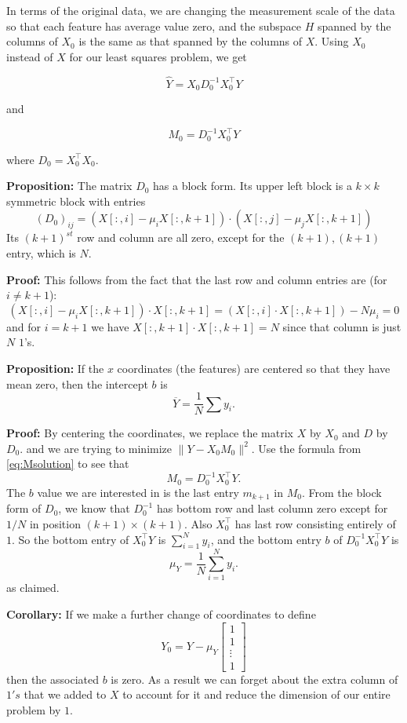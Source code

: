 \documentclass[
]{article}
\begin{document}
In terms of the original data, we are changing the measurement scale of
the data so that each feature has average value zero, and the subspace
\(H\) spanned by the columns of \(X_{0}\) is the same as that spanned by
the columns of \(X\). Using \(X_{0}\) instead of \(X\) for our least
squares problem, we get

\[
\hat{Y} = X_{0}D_{0}^{-1}X_{0}^{\intercal}Y
\]

and

\[
M_{0} = D_{0}^{-1}X_{0}^{\intercal}Y
\]

where \(D_{0}=X_{0}^{\intercal}X_{0}.\)

\textbf{Proposition:} The matrix \(D_{0}\) has a block form. Its upper
left block is a \(k\times k\) symmetric block with entries \[
(D_{0})_{ij} = (X[:,i]-\mu_{i}X[:,k+1])\cdot(X[:,j]-\mu_{j}X[:,k+1])
\] Its \((k+1)^{st}\) row and column are all zero, except for the
\((k+1),(k+1)\) entry, which is \(N\).

\textbf{Proof:} This follows from the fact that the last row and column
entries are (for \(i\not=k+1\)): \[
(X[:,i]-\mu_{i}X[:,k+1])\cdot X[:,k+1] = (X[:,i]\cdot X[:,k+1])-N\mu_{i} = 0
\] and for \(i=k+1\) we have \(X[:,k+1]\cdot X[:,k+1]=N\) since that
column is just \(N\) \(1\)'s.

\textbf{Proposition:} If the \(x\) coordinates (the features) are
centered so that they have mean zero, then the intercept \(b\) is \[
\overline{Y} = \frac{1}{N}\sum y_{i}.
\]

\textbf{Proof:} By centering the coordinates, we replace the matrix
\(X\) by \(X_{0}\) and \(D\) by \(D_{0}\). and we are trying to minimize
\(\|Y-X_{0}M_{0}\|^2\). Use the formula from \cref{eq:Msolution} to see
that \[
M_{0} = D_{0}^{-1}X_{0}^{\intercal}Y.
\] The \(b\) value we are interested in is the last entry \(m_{k+1}\) in
\(M_{0}\). From the block form of \(D_{0}\), we know that \(D_{0}^{-1}\)
has bottom row and last column zero except for \(1/N\) in position
\((k+1)\times(k+1)\). Also \(X_{0}^{\intercal}\) has last row consisting
entirely of \(1\). So the bottom entry of \(X_{0}^{\intercal}Y\) is
\(\sum_{i=1}^{N} y_{i}\), and the bottom entry \(b\) of
\(D_{0}^{-1}X_{0}^{\intercal}Y\) is \[
\mu_{Y} = \frac{1}{N}\sum_{i=1}^{N} y_{i}. 
\] as claimed.

\textbf{Corollary:} If we make a further change of coordinates to define
\[
Y_{0} = Y - \mu_{Y}\left[\begin{matrix} 1 \\ 1 \\ \vdots \\ 1\end{matrix}\right]
\] then the associated \(b\) is zero. As a result we can forget about
the extra column of \(1's\) that we added to \(X\) to account for it and
reduce the dimension of our entire problem by \(1\).
\end{document}
